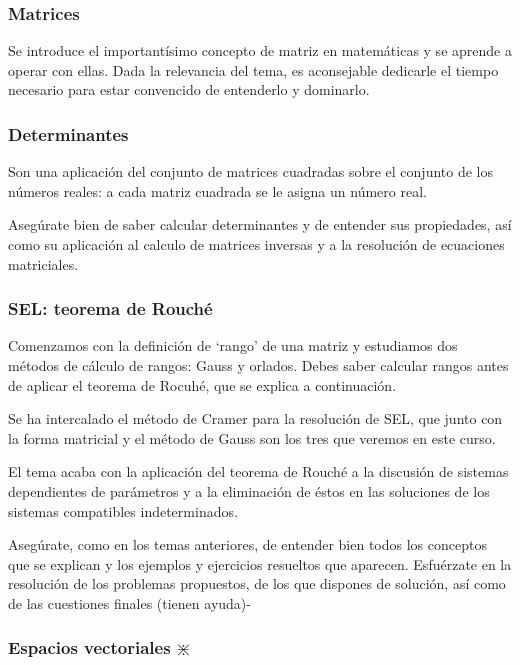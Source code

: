 \subsubsection{Matrices}

Se introduce el importantísimo concepto de matriz en matemáticas y se aprende a operar con ellas. Dada la relevancia del tema, es aconsejable dedicarle el tiempo necesario para estar convencido de entenderlo y dominarlo.

\subsubsection{Determinantes}

Son una aplicación del conjunto de matrices cuadradas sobre el conjunto de los números reales: a cada matriz cuadrada se le asigna un número real. 

Asegúrate bien de saber calcular determinantes y de entender sus propiedades, así como su aplicación al calculo de matrices inversas y a la resolución de ecuaciones matriciales.

\subsubsection{SEL: teorema de Rouché}

Comenzamos con la definición de `rango' de una matriz y estudiamos dos métodos de cálculo de rangos: Gauss y orlados. Debes saber calcular rangos antes de aplicar el teorema de Rocuhé, que se explica a continuación.

Se ha intercalado el método de Cramer para la resolución de SEL, que junto con la forma matricial y el método de Gauss son los tres que veremos en este curso.

El tema acaba con la aplicación del teorema de Rouché a la discusión de sistemas dependientes de parámetros y a la eliminación de éstos en las soluciones de los sistemas compatibles indeterminados.

Asegúrate, como en los temas anteriores, de entender bien todos los conceptos que se explican y los ejemplos y ejercicios resueltos que aparecen. Esfuérzate en la resolución de los problemas propuestos, de los que dispones de solución, así como de las cuestiones finales (tienen ayuda)-

\subsubsection{Espacios vectoriales  $\divideontimes$}

